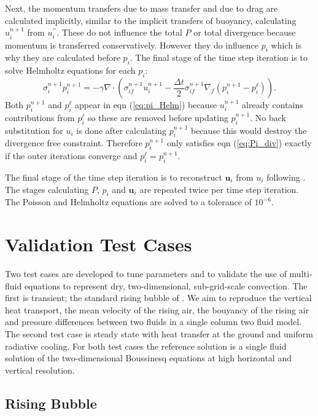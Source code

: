 \documentclass[draft]{agujournal2019}
\begin{document}
Next, the momentum transfers due to mass transfer and due to drag
are calculated implicitly, similar to the implicit transfers of buoyancy,
calculating $u_{i}^{n+1}$ from $u_{i}^{\prime\prime}$. These do
not influence the total $P$ or total divergence because momentum
is transferred conservatively. However they do influence $p_{i}$
which is why they are calculated before $p_{i}$. The final stage
of the time step iteration is to solve Helmholtz equations for each
$p_{i}$:
\begin{equation}
\sigma_{i}^{n+1}p_{i}^{n+1}=-\gamma\nabla\cdot\left(\sigma_{if}^{n+1}u_{i}^{n+1}-\frac{\Delta t}{2}\sigma_{if}^{n+1}\nabla_{f}\left(p_{i}^{n+1}-p_{i}^{\ell}\right)\right).\label{eq:pi_Helm}
\end{equation}
Both $p_{i}^{n+1}$ and $p_{i}^{\ell}$ appear in eqn (\ref{eq:pi_Helm})
because $u_{i}^{n+1}$ already contains contributions from $p_{i}^{\ell}$
so these are removed before updating $p_{i}^{n+1}$. No back substitution
for $u_{i}$ is done after calculating $p_{i}^{n+1}$ because this
would destroy the divergence free constraint. Therefore $p_{i}^{n+1}$
only satisfies eqn (\ref{eq:Pi_div}) exactly if the outer iterations
converge and $p_{i}^{\ell}=p_{i}^{n+1}$. 

The final stage of the time step iteration is to reconstruct $\mathbf{u}_{i}$
from $u_{i}$ following . The stages calculating $P$,
$p_{i}$ and $\mathbf{u}_{i}$ are repeated twice per time step iteration.
The Poisson and Helmholtz equations are solved to a tolerance of $10^{-6}$.

\section{Validation Test Cases\label{sec:results}}

Two test cases are developed to tune parameters and to validate the
use of multi-fluid equations to represent dry, two-dimensional, sub-grid-scale
convection. The first is transient; the standard rising bubble of
. We aim to reproduce the vertical heat transport, the
mean velocity of the rising air, the bouyancy of the rising air and
pressure differences between two fluids in a single column two fluid
model. The second test case is steady state with heat transfer at
the ground and uniform radiative cooling. For both test cases the
reference solution is a single fluid solution of the two-dimensional
Boussinesq equations at high horizontal and vertical resolution. 

\subsection{Rising Bubble}
\end{document}

